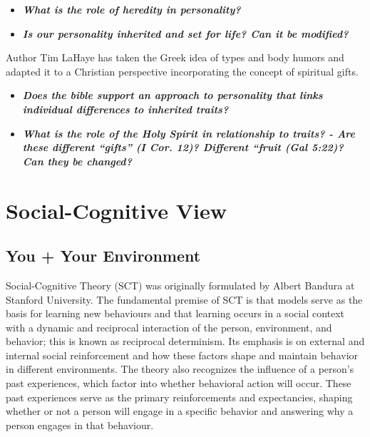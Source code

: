 \documentclass[
]{book}
\providecommand{\tightlist}{%
  \setlength{\itemsep}{0pt}\setlength{\parskip}{0pt}}
\begin{document}
\begin{reflect}
\begin{itemize}
\tightlist
\item
  \textbf{\emph{What is the role of heredity in personality?}}\\
\item
  \textbf{\emph{Is our personality inherited and set for life? Can it be modified?}}
\end{itemize}

Author Tim LaHaye has taken the Greek idea of types and body humors and adapted it to a Christian perspective incorporating the concept of spiritual gifts.

\begin{itemize}
\tightlist
\item
  \textbf{\emph{Does the bible support an approach to personality that links individual differences to inherited traits?}}\\
\item
  \textbf{\emph{What is the role of the Holy Spirit in relationship to traits? - Are these different ``gifts'' (I Cor. 12)? Different ``fruit (Gal 5:22)? Can they be changed?}}
\end{itemize}
\end{reflect}

\hypertarget{social-cognitive-view}{%
\section{Social-Cognitive View}\label{social-cognitive-view}}

\hypertarget{you-your-environment}{%
\subsection*{You + Your Environment}\label{you-your-environment}}

Social-Cognitive Theory (SCT) was originally formulated by Albert Bandura at Stanford University. The fundamental premise of SCT is that models serve as the basis for learning new behaviours and that learning occurs in a social context with a dynamic and reciprocal interaction of the person, environment, and behavior; this is known as reciprocal determinism. Its emphasis is on external and internal social reinforcement and how these factors shape and maintain behavior in different environments. The theory also recognizes the influence of a person's past experiences, which factor into whether behavioral action will occur. These past experiences serve as the primary reinforcements and expectancies, shaping whether or not a person will engage in a specific behavior and answering why a person engages in that behaviour.
\end{document}
